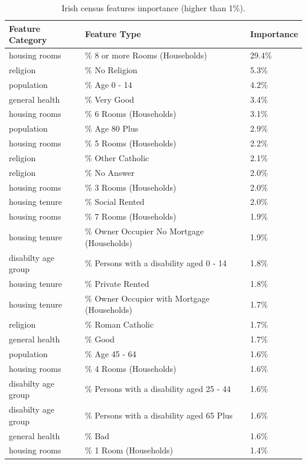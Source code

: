 \documentclass[]{elsarticle} %
\begin{document}
\begin{table}[!h]

\caption{\label{tab:census-features-table}Irish census features importance (higher than 1\%).}
\centering
\fontsize{8}{10}\selectfont
\begin{tabular}{>{\raggedright\arraybackslash}p{1in}>{\raggedright\arraybackslash}p{3in}l}
\toprule
Feature Category & Feature Type & Importance\\
\midrule
housing rooms & \% 8 or more Rooms (Households) & 29.4\%\\
religion & \% No Religion & 5.3\%\\
population & \% Age 0 - 14 & 4.2\%\\
general health & \% Very Good & 3.4\%\\
housing rooms & \% 6 Rooms (Households) & 3.1\%\\
population & \% Age 80 Plus & 2.9\%\\
housing rooms & \% 5 Rooms (Households) & 2.2\%\\
religion & \% Other Catholic & 2.1\%\\
religion & \% No Answer & 2.0\%\\
housing rooms & \% 3 Rooms (Households) & 2.0\%\\
housing tenure & \% Social Rented & 2.0\%\\
housing rooms & \% 7 Rooms (Households) & 1.9\%\\
housing tenure & \% Owner Occupier No Mortgage (Households) & 1.9\%\\
disabilty age group & \% Persons with a disability aged 0 - 14 & 1.8\%\\
housing tenure & \% Private Rented & 1.8\%\\
housing tenure & \% Owner Occupier with Mortgage (Households) & 1.7\%\\
religion & \% Roman Catholic & 1.7\%\\
general health & \% Good & 1.7\%\\
population & \% Age 45 - 64 & 1.6\%\\
housing rooms & \% 4 Rooms (Households) & 1.6\%\\
disabilty age group & \% Persons with a disability aged 25 - 44 & 1.6\%\\
disabilty age group & \% Persons with a disability aged 65 Plus & 1.6\%\\
general health & \% Bad & 1.6\%\\
housing rooms & \% 1 Room (Households) & 1.4\%\\

\end{tabular}
\end{table}
\end{document}
